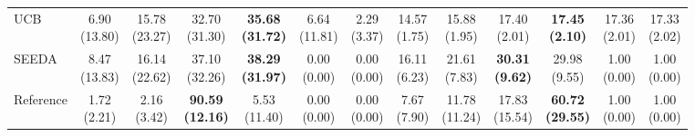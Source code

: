 {\begin{tabular}{l|cccccc|cccccc}
UCB & \makecell{6.90 \\ (13.80)} & \makecell{15.78 \\ (23.27)} & {\cellcolor[HTML]{C8E6C9}} \makecell{32.70 \\ (31.30)} & \bfseries \makecell{35.68 \\ (31.72)} & \makecell{6.64 \\ (11.81)} & \makecell{2.29 \\ (3.37)} & \makecell{14.57 \\ (1.75)} & \makecell{15.88 \\ (1.95)} & {\cellcolor[HTML]{C8E6C9}} \makecell{17.40 \\ (2.01)} & \bfseries \makecell{17.45 \\ (2.10)} & \makecell{17.36 \\ (2.01)} & \makecell{17.33 \\ (2.02)} \\
SEEDA & \makecell{8.47 \\ (13.83)} & \makecell{16.14 \\ (22.62)} & {\cellcolor[HTML]{C8E6C9}} \makecell{37.10 \\ (32.26)} & \bfseries \makecell{38.29 \\ (31.97)} & \makecell{0.00 \\ (0.00)} & \makecell{0.00 \\ (0.00)} & \makecell{16.11 \\ (6.23)} & \makecell{21.61 \\ (7.83)} & {\cellcolor[HTML]{C8E6C9}} \bfseries \makecell{30.31 \\ (9.62)} & \makecell{29.98 \\ (9.55)} & \makecell{1.00 \\ (0.00)} & \makecell{1.00 \\ (0.00)} \\
Reference & \makecell{1.72 \\ (2.21)} & \makecell{2.16 \\ (3.42)} & {\cellcolor[HTML]{C8E6C9}} \bfseries \makecell{90.59 \\ (12.16)} & \makecell{5.53 \\ (11.40)} & \makecell{0.00 \\ (0.00)} & \makecell{0.00 \\ (0.00)} & \makecell{7.67 \\ (7.90)} & \makecell{11.78 \\ (11.24)} & {\cellcolor[HTML]{C8E6C9}} \makecell{17.83 \\ (15.54)} & \bfseries \makecell{60.72 \\ (29.55)} & \makecell{1.00 \\ (0.00)} & \makecell{1.00 \\ (0.00)} \\

\end{tabular}}
